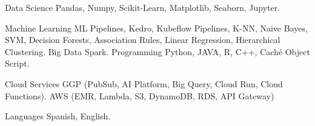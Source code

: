 

\begin{cvskills}

  \cvskill
    {Data Science} %
    {Pandas, Numpy, Scikit-Learn, Matplotlib, Seaborn, Jupyter.} %

  \cvskill
    {Machine Learning} %
    {ML Pipelines, Kedro, Kubeflow Pipelines, K-NN, Naive Bayes, SVM, Decision Forests, Association Rules, Linear Regression, Hierarchical Clustering.} %
  \cvskill
    {Big Data} %
    {Spark.} %
  \cvskill
    {Programming} %
    {Python, JAVA, R, C++, Caché Object Script.} %

  \cvskill
    {Cloud Services} %
    {GGP (PubSub, AI Platform, Big Query, Cloud Run, Cloud Functions). AWS (EMR, Lambda, S3, DynamoDB, RDS, API Gateway)} %

  \cvskill
    {Languages} %
    {Spanish, English.} %
\end{cvskills}
